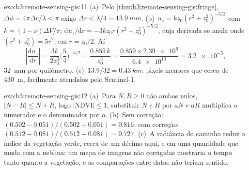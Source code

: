 \begin{solution}{exo:b3:remote-sensing-gis:11}
(a)~Pelo \cref{thm:b3:remote-sensing-gis:fringe}, $\Delta\phi =
4\pi\Delta r/\lambda < \pi$ exige $\Delta r < \lambda/4 =
\qty{13.9}{mm}$. (b)~$u_z = k z_0(r^2 + z_0^2)^{-3/2}$ com $k = (1 -
\nu)\Delta V/\pi$; $\mathrm du_z/\mathrm dr = -3kz_0r(r^2 + z_0^2)^{-5/2}$,
cuja derivada se anula onde $(r^2 + z_0^2) = 5r^2$, em $r = z_0/2$. Aí
\[
\left|\frac{\mathrm du_z}{\mathrm dr}\right| = \frac{3k}{2z_0^3}\Big(\frac54\Big)^{-5/2}
= \frac{0.859\,k}{z_0^3} = \frac{0.859\times\num{2.39e6}}{\num{6.4e10}} = \num{3.2e-5},
\]
\qty{32}{mm} por quilômetro. (c)~$13.9/32 = \qty{0.43}{km}$: pixels menores
que cerca de \qty{430}{m}, facilmente atendidos pelo Sentinel-1.
\end{solution}

\begin{solution}{exo:b3:remote-sensing-gis:12}
(a)~Para $N, R \ge 0$ não ambos nulos, $|N - R| \le N + R$, logo $|\mathrm{NDVI}|
\le 1$; substituir $N$ e $R$ por $aN$ e $aR$ multiplica o numerador e
o denominador por $a$. (b)~Sem correção: $(0.502 - 0.051)/(0.502 + 0.051) =
0.816$; com correção: $(0.512 - 0.081)/(0.512 + 0.081) = 0.727$. (c)~A
radiância do caminho reduz o índice da vegetação verde, cerca de um décimo aqui, e
em uma quantidade que muda com a neblina: um mapa de imagens não corrigidas
mostraria o tempo tanto quanto a vegetação, e as comparações entre datas
não teriam sentido.
\end{solution}

